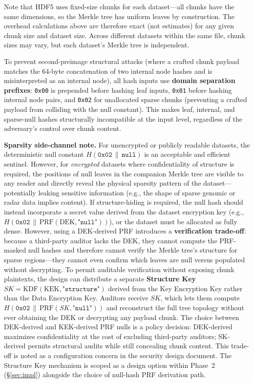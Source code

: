 \documentclass[11pt]{article}
\begin{document}
\noindent Note that HDF5 uses fixed-size chunks for each dataset---all chunks
have the same dimensions, so the Merkle tree has uniform leaves by
construction. The overhead calculations above are therefore exact (not
estimates) for any given chunk size and dataset size. Across different datasets
within the same file, chunk sizes may vary, but each dataset's Merkle tree is
independent.

To prevent second-preimage structural attacks (where a crafted chunk payload
matches the 64-byte concatenation of two internal node hashes and is
misinterpreted as an internal node), all hash inputs use \textbf{domain
separation prefixes}: \texttt{0x00} is prepended before hashing leaf inputs,
\texttt{0x01} before hashing internal node pairs, and \texttt{0x02} for
unallocated sparse chunks (preventing a crafted payload from colliding with
the null constant). This makes leaf, internal, and sparse-null hashes
structurally incompatible at the input level, regardless of
the adversary's control over chunk content.

\noindent\textbf{Sparsity side-channel note.}
For unencrypted or publicly readable datasets, the deterministic null
constant $H(\texttt{0x02}\,\|\,\texttt{null})$ is an acceptable and
efficient sentinel. However, for \emph{encrypted} datasets where
confidentiality of structure is required, the positions of null leaves in
the companion Merkle tree are visible to any reader and directly reveal the
physical sparsity pattern of the dataset---potentially leaking sensitive
information (e.g., the shape of sparse genomic or radar data implies content).
If structure-hiding is required, the null hash should instead incorporate a
secret value derived from the dataset encryption key
(e.g., $H(\texttt{0x02}\,\|\,\text{PRF}(\text{DEK},\texttt{"null"}))$),
or the dataset must be allocated as fully dense.
However, using a DEK-derived PRF introduces a \textbf{verification
trade-off}: because a third-party auditor lacks the DEK, they cannot
compute the PRF-masked null hashes and therefore cannot verify the Merkle
tree's structure for sparse regions---they cannot even confirm which leaves
are null versus populated without decrypting.  To permit auditable
verification without exposing chunk plaintexts, the design can distribute a
separate \textbf{Structure Key} $SK = \text{KDF}(\text{KEK},\texttt{"structure"})$
derived from the Key Encryption Key rather than the Data Encryption Key.
Auditors receive $SK$, which lets them compute
$H(\texttt{0x02}\,\|\,\text{PRF}(SK,\texttt{"null"}))$
and reconstruct the full tree topology without ever obtaining the DEK or
decrypting any payload chunk.  The choice between DEK-derived and
KEK-derived PRF nulls is a policy decision: DEK-derived maximizes
confidentiality at the cost of excluding third-party auditors; SK-derived
permits structural audits while still concealing chunk content.
This trade-off is noted as a configuration concern in the security design document.
The Structure Key mechanism is scoped as a design option within Phase~2
(\S\ref{sec:impl}) alongside the choice of null-hash PRF derivation path.
\end{document}
